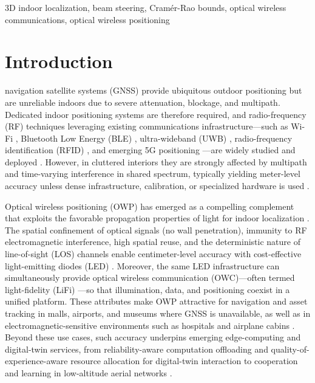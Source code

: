 \documentclass[journal]{IEEEtran}
\begin{document}
\begin{IEEEkeywords} 
    3D indoor localization, beam steering, Cramér-Rao bounds, optical wireless communications, optical wireless positioning
\end{IEEEkeywords}

\section{Introduction}

 navigation satellite systems (GNSS) provide ubiquitous outdoor positioning but are unreliable indoors due to severe attenuation, blockage, and multipath. Dedicated indoor positioning systems are therefore required, and radio-frequency (RF) techniques leveraging existing communications infrastructure---such as Wi-Fi \cite{He2016}, Bluetooth Low Energy (BLE) \cite{Faragher2015}, ultra-wideband (UWB) \cite{Alarifi2016}, radio-frequency identification (RFID) \cite{Ni2004}, and emerging 5G positioning \cite{Italiano2025}---are widely studied and deployed \cite{Zafari2019, Italiano2025}. However, in cluttered interiors they are strongly affected by multipath and time-varying interference in shared spectrum, typically yielding meter-level accuracy unless dense infrastructure, calibration, or specialized hardware is used \cite{Lymberopoulos2015, Leitch2023}.

Optical wireless positioning (OWP) has emerged as a compelling complement that exploits the favorable propagation properties of light for indoor localization \cite{Wang2024b}. The spatial confinement of optical signals (no wall penetration), immunity to RF electromagnetic interference, high spatial reuse, and the deterministic nature of line-of-sight (LOS) channels enable centimeter-level accuracy with cost-effective light-emitting diodes (LED) \cite{Trevlakis2023}. Moreover, the same LED infrastructure can simultaneously provide optical wireless communication (OWC)---often termed light-fidelity (LiFi) \cite{Haas:16}---so that illumination, data, and positioning coexist in a unified platform. These attributes make OWP attractive for navigation and asset tracking in malls, airports, and museums where GNSS is unavailable, as well as in electromagnetic-sensitive environments such as hospitals and airplane cabins \cite{Wang2024b, Zhu2025}. Beyond these use cases, such accuracy underpins emerging edge-computing and digital-twin services, from reliability-aware computation offloading \cite{Peng2022} and quality-of-experience-aware resource allocation for digital-twin interaction \cite{Chen2026} to cooperation and learning in low-altitude aerial networks \cite{Zhou2026}.
\end{document}
